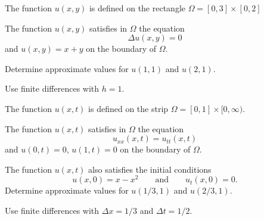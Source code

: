 \begin{teilaufgaben}
\item
The function $u(x,y)$ is defined on the rectangle
$\Omega = [0,3] \times [0,2]$

The function $u(x,y)$ satisfies in $\Omega$ the equation
\[
\Delta u(x,y) = 0
\]
and  $u(x,y) = x+y$ on the boundary of $\Omega$.

Determine approximate values for $u(1,1)$ and $u(2,1)$.

Use finite differences with $h = 1$. 

\item
The function $u(x,t)$ is defined on the strip
$\Omega = [0, 1] \times [0,\infty)$.

The function $u(x,t)$ satisfies in $\Omega$ the equation
\[
u_{xx}(x,t) = u_{tt}(x,t)
\]
and  $u(0,t) = 0$, $u(1,t) = 0$ on the boundary of $\Omega$. 

The function $u(x,t)$ also satisfies the initial conditions
\[
u(x,0) = x-x^2 \qquad\text{and} \qquad u_t(x,0) = 0.
\]
Determine approximate values for $u(1/3,1)$ and $u(2/3,1)$.

Use finite differences with $\Delta x = 1/3$ and $\Delta t = 1/2.$
\end{teilaufgaben}

